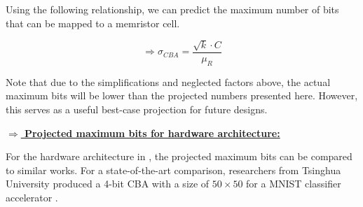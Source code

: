 \noindent
Using the following relationship, we can predict the maximum number of bits that can be mapped to a memristor cell.

$$ \Rightarrow \sigma_{CBA} = \frac{\sqrt{k} \cdot C}{\mu_{R}} $$

\vspace{0.2em}

\noindent
Note that due to the simplifications and neglected factors above, the actual maximum bits will be lower than the projected numbers presented here. However, this serves as a useful best-case projection for future designs.

\vspace{0.7em}
\noindent\underline{\textbf{$\Rightarrow$ Projected maximum bits for hardware architecture:}}
\vspace{0.2em}

\noindent
For the hardware architecture in , the projected maximum bits can be compared to similar works. For a state-of-the-art comparison, researchers from Tsinghua University produced a 4-bit \ac{CBA} with a size of $50\times 50$ for a MNIST classifier accelerator \cite{PengGu2015}. 

